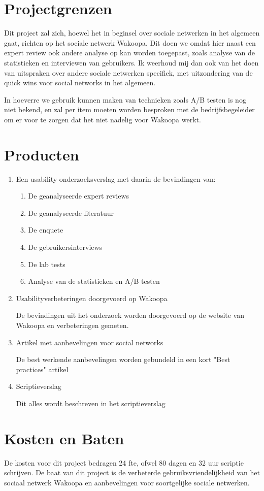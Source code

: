 \documentclass[a4paper, 10pt, pdftex]{article}
\begin{document}
\section{Projectgrenzen}
Dit project zal zich, hoewel het in beginsel over sociale netwerken in het algemeen gaat, richten op het sociale netwerk Wakoopa. Dit doen we omdat hier naast een expert review ook andere analyse op kan worden toegepast, zoals analyse van de statistieken en interviewen van gebruikers. Ik weerhoud mij dan ook van het doen van uitspraken over andere sociale netwerken specifiek, met uitzondering van de quick wins voor social networks in het algemeen.

In hoeverre we gebruik kunnen maken van technieken zoals A/B testen is nog niet bekend, en zal per item moeten worden besproken met de bedrijfsbegeleider om er voor te zorgen dat het niet nadelig voor Wakoopa werkt.

\section{Producten}
\begin{enumerate}
\item
Een usability onderzoeksverslag met daarin de bevindingen van:
  \begin{enumerate}
  \item
  De geanalyseerde expert reviews
  \item
  De geanalyseerde literatuur
  \item
  De enquete
  \item
  De gebruikersinterviews
  \item
  De lab tests
  \item
  Analyse van de statistieken en A/B testen
  \end{enumerate}
\item
Usabilityverbeteringen doorgevoerd op Wakoopa

De bevindingen uit het onderzoek worden doorgevoerd op de website van Wakoopa en verbeteringen gemeten.
\item
Artikel met aanbevelingen voor social networks

De best werkende aanbevelingen worden gebundeld in een kort "Best practices" artikel
\item
Scriptieverslag

Dit alles wordt beschreven in het scriptieverslag
\end{enumerate}


\section{Kosten en Baten}
De kosten voor dit project bedragen 24 fte, ofwel 80 dagen en 32 uur scriptie schrijven. De baat van dit project is de verbeterde
gebruiksvriendelijkheid van het sociaal netwerk Wakoopa en aanbevelingen voor soortgelijke sociale netwerken.
\end{document}

